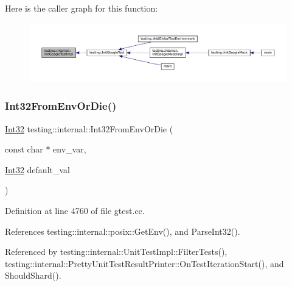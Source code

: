 Here is the caller graph for this function\+:
\nopagebreak
\begin{figure}[H]
\begin{center}
\leavevmode
\includegraphics[width=350pt]{namespacetesting_1_1internal_ac3c6fa93391768aa91c6238b31aaeeb5_icgraph}
\end{center}
\end{figure}
\mbox{\label{namespacetesting_1_1internal_aaa576613655c2f380278c255c3ec5fef}} 
\subsubsection{\texorpdfstring{Int32\+From\+Env\+Or\+Die()}{Int32FromEnvOrDie()}}
{\footnotesize\ttfamily \hyperlink{namespacetesting_1_1internal_a8ee38faaf875f133358abaf9bc056cec}{Int32} testing\+::internal\+::\+Int32\+From\+Env\+Or\+Die (\begin{DoxyParamCaption}\item[{const char $\ast$}]{env\+\_\+var,  }\item[{\hyperlink{namespacetesting_1_1internal_a8ee38faaf875f133358abaf9bc056cec}{Int32}}]{default\+\_\+val }\end{DoxyParamCaption})}



Definition at line 4760 of file gtest.\+cc.



References testing\+::internal\+::posix\+::\+Get\+Env(), and Parse\+Int32().



Referenced by testing\+::internal\+::\+Unit\+Test\+Impl\+::\+Filter\+Tests(), testing\+::internal\+::\+Pretty\+Unit\+Test\+Result\+Printer\+::\+On\+Test\+Iteration\+Start(), and Should\+Shard().


